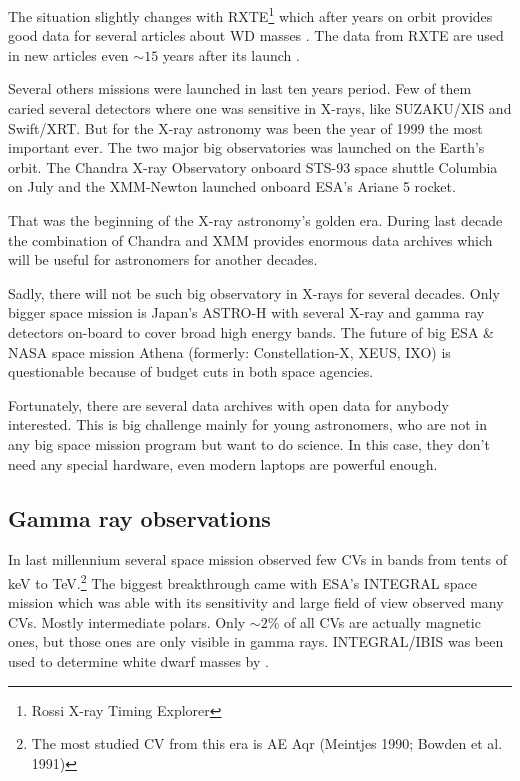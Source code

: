 \documentclass[oneside,a4paper,11pt]{report}
\begin{document}
The situation slightly changes with RXTE\footnote{Rossi X-ray Timing Explorer} which after 
years on orbit provides good data for several articles about WD masses \citet{2005A&A...435..191S}. 
The data from RXTE are used in new articles even $\sim15$ years after its launch \citet{2011A&A...526A..77B}.
 
Several others missions were launched in last ten years period. Few of them caried several 
detectors where one was sensitive in X-rays, like SUZAKU/XIS and Swift/XRT. But for the X-ray 
astronomy was been the year of 1999 the most important ever. The two major big observatories 
was launched on the Earth's orbit. The Chandra X-ray Observatory onboard STS-93 space shuttle 
Columbia on July and the XMM-Newton launched onboard ESA's Ariane 5 rocket.

   That was the beginning of the X-ray astronomy's golden era. During last decade the combination of 
Chandra and XMM provides enormous data archives which will be useful for astronomers for another 
decades. 

Sadly, there will not be such big observatory in X-rays for several decades. Only bigger space 
mission is Japan's ASTRO-H with several X-ray and gamma ray detectors on-board to cover broad 
high energy bands. The future of big ESA \& NASA space mission Athena (formerly: Constellation-X, 
XEUS, IXO)  is questionable because of budget cuts in both space agencies. 

Fortunately, there are several data archives with open data for anybody 
interested. This is big challenge mainly for young astronomers, who are 
not in any big space mission program but want to do science. In this case, 
they don't need any special hardware, even modern laptops are powerful enough.     



    
\subsection{Gamma ray observations}
In last millennium several space mission observed few CVs in bands from tents of keV to TeV.\footnote{The most 
studied CV from this era is AE Aqr (Meintjes 1990; Bowden et al. 1991)}
The biggest breakthrough came with ESA's INTEGRAL space mission which was able with its sensitivity 
and large field of view observed many CVs. Mostly intermediate polars. Only $\sim 2\%$ 
of all CVs are actually magnetic ones, but those ones are only visible in gamma rays.
INTEGRAL/IBIS was been used to determine white dwarf masses by \citet{2009MNRAS.392..630L}.
\end{document}
